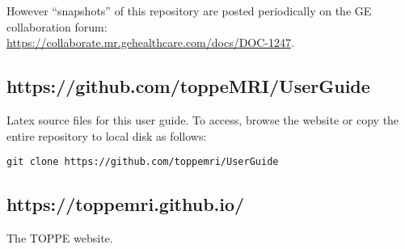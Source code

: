 However ``snapshots'' of this repository are posted periodically on the GE collaboration forum: \\
\url{https://collaborate.mr.gehealthcare.com/docs/DOC-1247}.


\subsection{https://github.com/toppeMRI/UserGuide}

Latex source files for this user guide.
To access, browse the website or copy the entire repository to local disk as follows:
\begin{lstlisting}
git clone https://github.com/toppemri/UserGuide
\end{lstlisting}



\subsection{https://toppemri.github.io/}

The TOPPE website.




